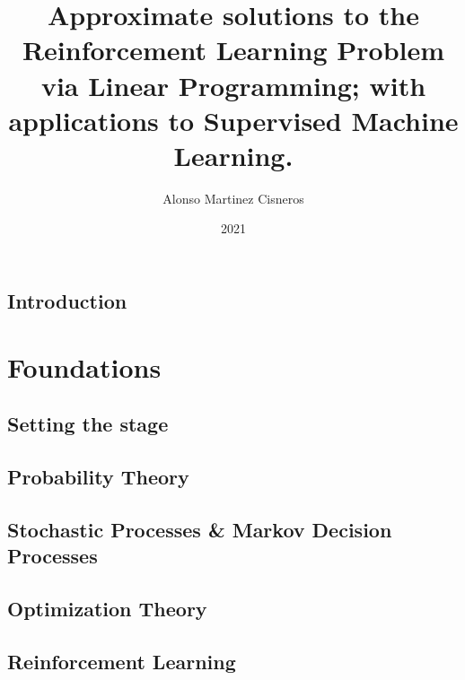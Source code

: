 \documentclass[colorful]{sty/itam-thesis}
\author{Alonso Martinez Cisneros}
\title{Approximate solutions to the Reinforcement Learning 
Problem via Linear Programming; with applications to Supervised 
Machine Learning.}
\date{2021}
\begin{document}
\frontmatter
{}
\maketitle
\makefrontmatter

\cleardoublepage
\pagestyle{plain}






\tableofcontents

\mainmatter


% 
\chapter*{Introduction}




\part{Foundations}

\chapter{Setting the stage}


\chapter{Probability Theory}
\chapter{Stochastic Processes \& Markov Decision Processes}
\chapter{Optimization Theory}

\chapter{Reinforcement Learning}

\end{document}

